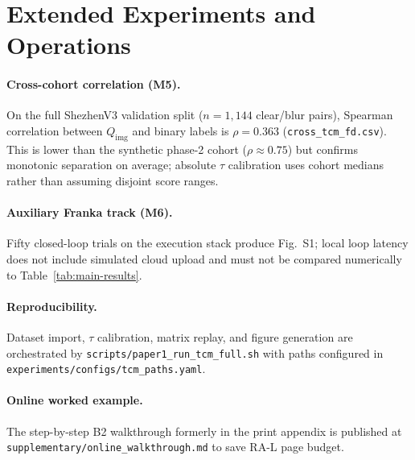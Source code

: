 \section{Extended Experiments and Operations}
\label{sec:app-experiments}

\paragraph{Cross-cohort correlation (M5).}
On the full ShezhenV3 validation split ($n{=}1{,}144$ clear/blur pairs), Spearman correlation between $Q_{\mathrm{img}}$ and binary labels is $\rho{=}0.363$ (\texttt{cross\_tcm\_fd.csv}).
This is lower than the synthetic phase-2 cohort ($\rho{\approx}0.75$) but confirms monotonic separation on average; absolute $\tau$ calibration uses cohort medians rather than assuming disjoint score ranges.

\paragraph{Auxiliary Franka track (M6).}
Fifty closed-loop trials on the execution stack produce Fig.~S1; local loop latency does not include simulated cloud upload and must not be compared numerically to Table~\ref{tab:main-results}.

\paragraph{Reproducibility.}
Dataset import, $\tau$ calibration, matrix replay, and figure generation are orchestrated by \texttt{scripts/paper1\_run\_tcm\_full.sh} with paths configured in \texttt{experiments/configs/tcm\_paths.yaml}.










\paragraph{Online worked example.}
The step-by-step B2 walkthrough formerly in the print appendix is published at \texttt{supplementary/online\_walkthrough.md} to save RA-L page budget.
